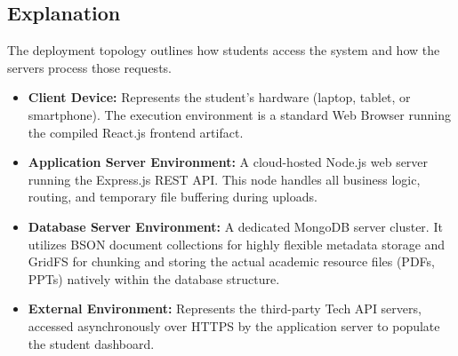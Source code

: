 \documentclass[12pt, a4paper]{article}
\begin{document}
\subsection{Explanation}
The deployment topology outlines how students access the system and how the servers process those requests.
\begin{itemize}
    \item \textbf{Client Device:} Represents the student's hardware (laptop, tablet, or smartphone). The execution environment is a standard Web Browser running the compiled React.js frontend artifact.
    \item \textbf{Application Server Environment:} A cloud-hosted Node.js web server running the Express.js REST API. This node handles all business logic, routing, and temporary file buffering during uploads.
    \item \textbf{Database Server Environment:} A dedicated MongoDB server cluster. It utilizes BSON document collections for highly flexible metadata storage and GridFS for chunking and storing the actual academic resource files (PDFs, PPTs) natively within the database structure.
    \item \textbf{External Environment:} Represents the third-party Tech API servers, accessed asynchronously over HTTPS by the application server to populate the student dashboard.
\end{itemize}
\end{document}
